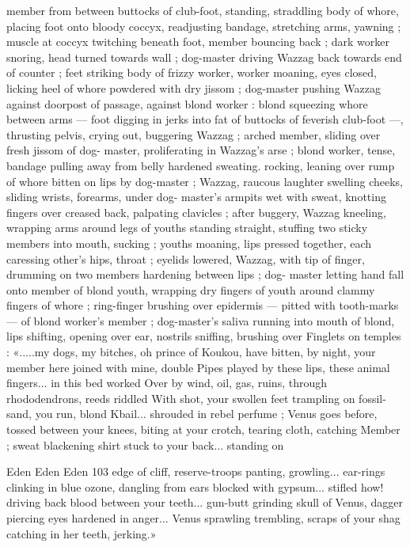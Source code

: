 member from between buttocks of club-foot, standing, straddling
body of whore, placing foot onto bloody coccyx, readjusting
bandage, stretching arms, yawning ; muscle at coccyx twitching
beneath foot, member bouncing back ; dark worker snoring, head
turned towards wall ; dog-master driving Wazzag back towards end
of counter ; feet striking body of frizzy worker, worker moaning, eyes
closed, licking heel of whore powdered with dry jissom ; dog-master
pushing Wazzag against doorpost of passage, against blond worker
: blond squeezing whore between arms — foot digging in jerks into
fat of buttocks of feverish club-foot —, thrusting pelvis, crying out,
buggering Wazzag ; arched member, sliding over fresh jissom of dog-
master, proliferating in Wazzag's arse ; blond worker, tense, bandage
pulling away from belly hardened sweating. rocking, leaning over
rump of whore bitten on lips by dog-master ; Wazzag, raucous
laughter swelling cheeks, sliding wrists, forearms, under dog-
master's armpits wet with sweat, knotting fingers over creased back,
palpating clavicles ; after buggery, Wazzag kneeling, wrapping arms
around legs of youths standing straight, stuffing two sticky members
into mouth, sucking ; youths moaning, lips pressed together, each
caressing other's hips, throat ; eyelids lowered, Wazzag, with tip of
finger, drumming on two members hardening between lips ; dog-
master letting hand fall onto member of blond youth, wrapping dry
fingers of youth around clammy fingers of whore ; ring-finger
brushing over epidermis — pitted with tooth-marks — of blond
worker's member ; dog-master's saliva running into mouth of blond,
lips shifting, opening over ear, nostrils sniffing, brushing over
Finglets on temples : «.....my dogs, my bitches, oh prince of Koukou,
have bitten, by night, your member here joined with mine, double
Pipes played by these lips, these animal fingers... in this bed worked
Over by wind, oil, gas, ruins, through rhododendrons, reeds riddled
With shot, your swollen feet trampling on fossil-sand, you run, blond
Kbail... shrouded in rebel perfume ; Venus goes before, tossed
between your knees, biting at your crotch, tearing cloth, catching
Member ; sweat blackening shirt stuck to your back... standing on

Eden Eden Eden 103
edge of cliff, reserve-troops panting, growling... ear-rings clinking in
blue ozone, dangling from ears blocked with gypsum... stifled how!
driving back blood between your teeth... gun-butt grinding skull of
Venus, dagger piercing eyes hardened in anger... Venus sprawling
trembling, scraps of your shag catching in her teeth, jerking.»

